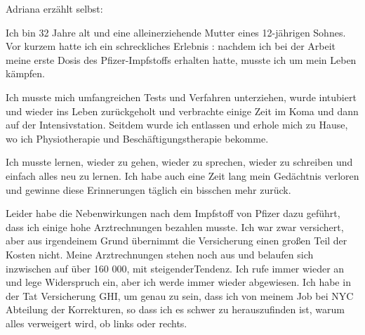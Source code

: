 Adriana erzählt selbst:

Ich bin 32 Jahre alt und eine alleinerziehende Mutter eines 12-jährigen
Sohnes. Vor kurzem hatte ich ein schreckliches Erlebnis : nachdem ich bei der
Arbeit meine erste Dosis des Pfizer-Impfstoffs erhalten hatte, musste ich um
mein Leben kämpfen.

Ich musste mich umfangreichen Tests und Verfahren unterziehen, wurde intubiert
und wieder ins Leben zurückgeholt und verbrachte einige Zeit im Koma und dann
auf der Intensivstation. Seitdem wurde ich entlassen und erhole mich zu Hause,
wo ich Physiotherapie und Beschäftigungstherapie bekomme.

Ich musste lernen, wieder zu gehen, wieder zu sprechen, wieder zu schreiben und
einfach alles neu zu lernen. Ich habe auch eine Zeit lang mein Gedächtnis
verloren und gewinne diese Erinnerungen täglich ein bisschen mehr zurück.

Leider habe die Nebenwirkungen nach dem Impfstoff von Pfizer dazu geführt, dass
ich einige hohe Arztrechnungen bezahlen musste. Ich war zwar versichert, aber
aus irgendeinem Grund übernimmt die Versicherung einen großen Teil der Kosten
nicht. Meine Arztrechnungen stehen noch aus und belaufen sich inzwischen auf
über 160 000, mit steigenderTendenz. Ich rufe immer wieder an und lege
Widerspruch ein, aber ich werde immer wieder abgewiesen. Ich habe in der Tat
Versicherung GHI, um genau zu sein, dass ich von meinem Job bei NYC Abteilung
der Korrekturen, so dass ich es schwer zu herauszufinden ist, warum alles
verweigert wird, ob links oder rechts.
